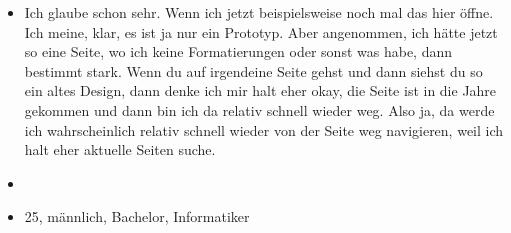 {\begin{itemize}[]
            \item {} Ich glaube schon sehr.
                  Wenn ich jetzt beispielsweise noch mal das hier öffne.
                  Ich meine, klar, es ist ja nur ein Prototyp.
                  Aber angenommen, ich hätte jetzt so eine Seite, wo ich keine Formatierungen oder sonst was habe, dann bestimmt stark.
                  Wenn du auf irgendeine Seite gehst und dann siehst du so ein altes Design, dann denke ich mir halt eher okay, die Seite ist in die Jahre gekommen und dann bin ich da relativ schnell wieder weg.
                  Also ja, da werde ich wahrscheinlich relativ schnell wieder von der Seite weg navigieren, weil ich halt eher aktuelle Seiten suche.
            \item {}
            \item {} 25, männlich, Bachelor, Informatiker
      \end{itemize}}
\nolinenumbers
